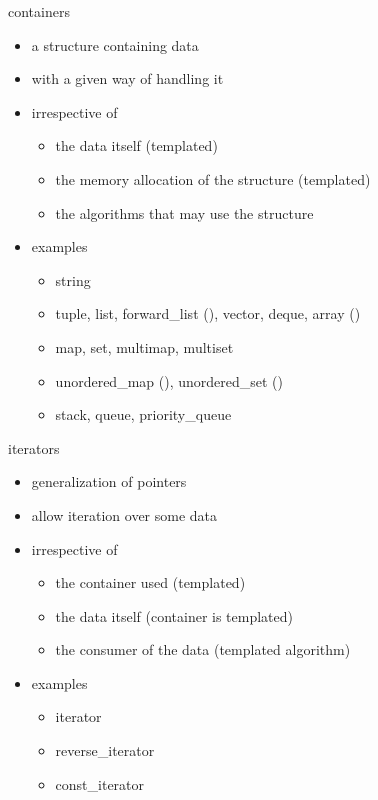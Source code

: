 \begin{frame}[fragile]
  \begin{block}{containers}
    \begin{itemize}
    \item a structure containing data
    \item with a given way of handling it
    \item irrespective of
      \begin{itemize}
      \item the data itself (templated)
      \item the memory allocation of the structure (templated)
      \item the algorithms that may use the structure
      \end{itemize}
    \item examples
      \begin{itemize}
      \item string
      \item tuple, list, forward\_list (), vector, deque, array ()
      \item map, set, multimap, multiset
      \item unordered\_map (), unordered\_set ()
      \item stack, queue, priority\_queue
      \end{itemize}
    \end{itemize}
  \end{block}
\end{frame}

\begin{frame}[fragile]
  \begin{block}{iterators}
    \begin{itemize}
    \item generalization of pointers
    \item allow iteration over some data
    \item irrespective of
      \begin{itemize}
      \item the container used (templated)
      \item the data itself (container is templated)
      \item the consumer of the data (templated algorithm)
      \end{itemize}
    \item examples
      \begin{itemize}
      \item iterator
      \item reverse\_iterator
      \item const\_iterator
      \end{itemize}
    \end{itemize}
  \end{block}
\end{frame}


